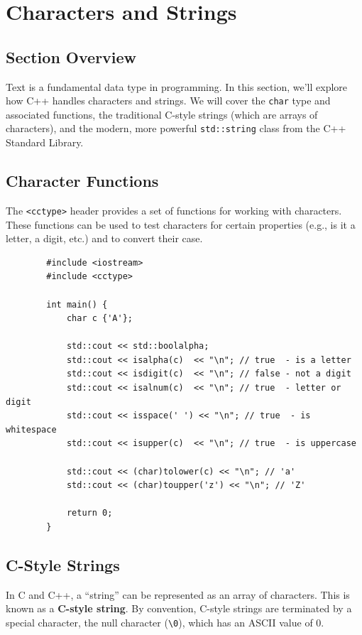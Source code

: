 \section{Characters and Strings}

\subsection{Section Overview}
Text is a fundamental data type in programming. In this section, we'll explore how C++ handles characters and strings. We will cover the \texttt{char} type and associated functions, the traditional C-style strings (which are arrays of characters), and the modern, more powerful \texttt{std::string} class from the C++ Standard Library.

\subsection{Character Functions}
The \texttt{<cctype>} header provides a set of functions for working with characters. These functions can be used to test characters for certain properties (e.g., is it a letter, a digit, etc.) and to convert their case.

\begin{example}{\leavevmode}
	\begin{lstlisting}
		#include <iostream>
		#include <cctype>

		int main() {
			char c {'A'};

			std::cout << std::boolalpha;
			std::cout << isalpha(c)  << "\n"; // true  - is a letter
			std::cout << isdigit(c)  << "\n"; // false - not a digit
			std::cout << isalnum(c)  << "\n"; // true  - letter or digit
			std::cout << isspace(' ') << "\n"; // true  - is whitespace
			std::cout << isupper(c)  << "\n"; // true  - is uppercase

			std::cout << (char)tolower(c) << "\n"; // 'a'
			std::cout << (char)toupper('z') << "\n"; // 'Z'

			return 0;
		}
	\end{lstlisting}
\end{example}

\subsection{C-Style Strings}
In C and C++, a ``string'' can be represented as an array of characters. This is known as a \textbf{C-style string}. By convention, C-style strings are terminated by a special character, the null character (\texttt{\textbackslash{}0}), which has an ASCII value of 0.

